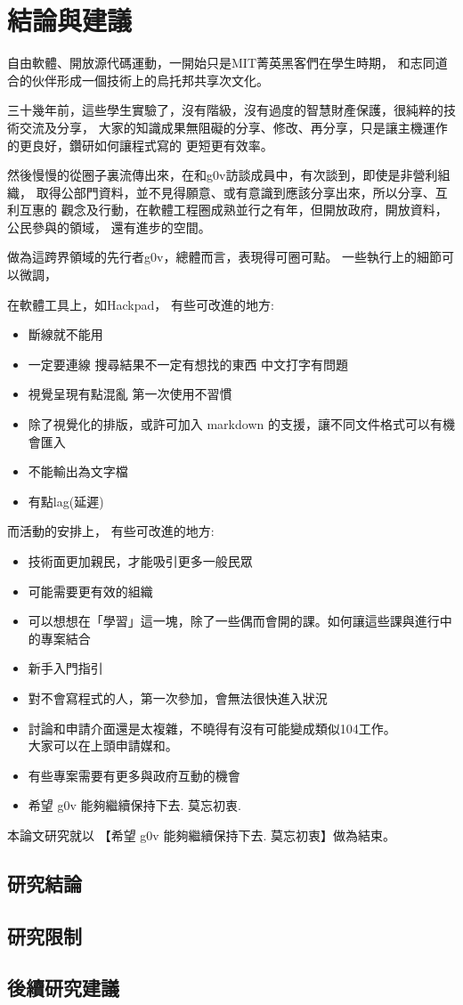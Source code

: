 \chapter{結論與建議}
自由軟體、開放源代碼運動，一開始只是MIT菁英黑客們在學生時期，
和志同道合的伙伴形成一個技術上的烏托邦共享次文化。

三十幾年前，這些學生實驗了，沒有階級，沒有過度的智慧財產保護，很純粹的技術交流及分享，
大家的知識成果無阻礙的分享、修改、再分享，只是讓主機運作的更良好，鑽研如何讓程式寫的
更短更有效率。

然後慢慢的從圈子裏流傳出來，在和g0v訪談成員中，有次談到，即使是非營利組織，
取得公部門資料，並不見得願意、或有意識到應該分享出來，所以分享、互利互惠的
觀念及行動，在軟體工程圈成熟並行之有年，但開放政府，開放資料，公民參與的領域，
還有進步的空間。

做為這跨界領域的先行者g0v，總體而言，表現得可圈可點。
一些執行上的細節可以微調，

在軟體工具上，如Hackpad，
有些可改進的地方:
\begin{itemize}
\item 斷線就不能用
\item 一定要連線 搜尋結果不一定有想找的東西 中文打字有問題
\item 視覺呈現有點混亂 第一次使用不習慣
\item 除了視覺化的排版，或許可加入 markdown 的支援，讓不同文件格式可以有機會匯入
\item 不能輸出為文字檔
\item 有點lag(延遲)
\end{itemize}

而活動的安排上，
有些可改進的地方:
\begin{itemize}
\item 技術面更加親民，才能吸引更多一般民眾
\item 可能需要更有效的組織
\item 可以想想在「學習」這一塊，除了一些偶而會開的課。如何讓這些課與進行中的專案結合
\item 新手入門指引
\item 對不會寫程式的人，第一次參加，會無法很快進入狀況
\item 討論和申請介面還是太複雜，不曉得有沒有可能變成類似104工作。\\ 大家可以在上頭申請媒和。
\item 有些專案需要有更多與政府互動的機會
\item 希望 g0v 能夠繼續保持下去. 莫忘初衷.

\end{itemize}

本論文研究就以 【希望 g0v 能夠繼續保持下去. 莫忘初衷】做為結束。


\section{研究結論}

\section{研究限制}
\section{後續研究建議}
